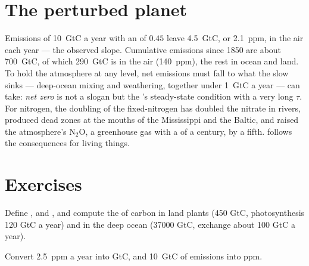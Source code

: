 \section{The perturbed planet}

\begin{example}\label{ex:b2:biogeochemical-cycles:numbers}
Emissions of \qty{10}{GtC} a year with an  of
$0.45$ leave \qty{4.5}{GtC}, or \qty{2.1}{ppm}, in the air each year
--- the observed slope. Cumulative emissions since 1850 are about
\qty{700}{GtC}, of which \qty{290}{GtC} is in the air (140~ppm), the
rest in ocean and land. To hold the atmosphere at any level, net
emissions must fall to what the slow sinks --- deep-ocean mixing and
weathering, together under \qty{1}{GtC} a year --- can take:
\emph{net zero} is not a slogan but the 's steady-state
condition with a very long $\tau$. For nitrogen, the doubling of
the fixed-nitrogen  has doubled the nitrate in rivers, produced
dead zones at the mouths of the Mississippi and the Baltic, and
raised the atmosphere's $\mathrm{N_2O}$, a greenhouse gas with a  of a century, by a fifth.  follows
the consequences for living things.
\end{example}

\section{Exercises}

\begin{exercise}[$\star$]\label{exo:b2:biogeochemical-cycles:1}
Define ,  and , and compute the
 of carbon in land plants (450 GtC, photosynthesis
120 GtC a year) and in the deep ocean (\num{37000} GtC, exchange
about 100 GtC a year).
\end{exercise}

\begin{exercise}[$\star$]\label{exo:b2:biogeochemical-cycles:2}
Convert \qty{2.5}{ppm} a year into GtC, and \qty{10}{GtC} of
emissions into ppm.
\end{exercise}

